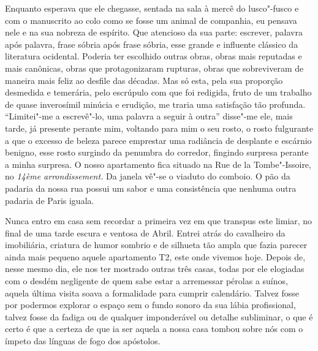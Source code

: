 Enquanto esperava que ele chegasse, sentada na sala à
mercê do lusco"-fusco e com o manuscrito ao colo como se fosse um animal
de companhia, eu pensava nele e na sua nobreza de espírito. Que
atencioso da sua parte: escrever, palavra após palavra, frase sóbria
após frase sóbria, esse grande e influente clássico da literatura
ocidental. Poderia ter escolhido outras obras, obras mais reputadas e
mais canônicas, obras que protagonizaram rupturas, obras que
sobreviveram de maneira mais feliz ao desfile das décadas. Mas só
esta, pela sua proporção desmedida e temerária, pelo escrúpulo com que
foi redigida, fruto de um trabalho de quase inverosímil minúcia e
erudição, me traria uma satisfação tão profunda. ``Limitei"-me a
escrevê"-lo, uma palavra a seguir à outra'' disse"-me ele, mais tarde, já
presente perante mim, voltando para mim o seu rosto, o rosto
fulgurante a que o excesso de beleza parece emprestar uma radiância de
desplante e escárnio benigno, esse rosto surgindo da penumbra do
corredor, fingindo surpresa perante a minha surpresa. O nosso
apartamento fica situado na Rue de la Tombe"-Issoire, no \emph{14ème
arrondissement. }Da janela vê"-se o viaduto do comboio. O pão da padaria
da nossa rua possui um sabor e uma consistência que nenhuma outra
padaria de Paris iguala.

Nunca entro em casa sem recordar a primeira vez em que transpus este
limiar, no final de uma tarde escura e ventosa de Abril. Entrei atrás do
cavalheiro da imobiliária, criatura de humor sombrio e de silhueta tão
ampla que fazia parecer ainda mais pequeno aquele apartamento T2, este
onde vivemos hoje. Depois de, nesse mesmo dia, ele nos ter mostrado
outras três casas, todas por ele elogiadas com o desdém negligente de
quem sabe estar a arremessar pérolas a suínos, aquela última visita
soava a formalidade para cumprir calendário. Talvez fosse por podermos
explorar o espaço sem o fundo
sonoro da sua lábia profissional, talvez fosse da fadiga ou de qualquer
imponderável ou detalhe subliminar, o que é certo é que a certeza de que
ia ser aquela a nossa casa tombou sobre nós com o ímpeto das línguas de
fogo dos apóstolos.

